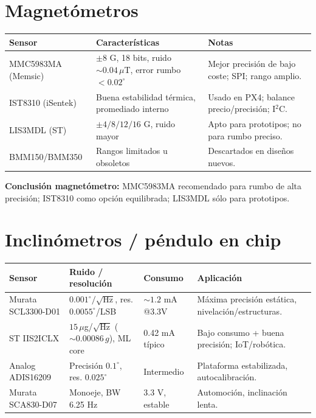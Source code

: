 \documentclass[11pt,a4paper]{article}
\begin{document}
\section{Magnetómetros}
\begin{longtable}{|>{\raggedright}p{3cm}|>{\raggedright}p{4cm}|>{\raggedright\arraybackslash}p{6cm}|}
\hline
\textbf{Sensor} & \textbf{Características} & \textbf{Notas} \\
\hline
MMC5983MA (Memsic) & $\pm 8$ G, 18 bits, ruido $\sim 0.04\,\mu$T, error rumbo $<0.02^\circ$ & Mejor precisión de bajo coste; SPI; rango amplio. \\
\hline
IST8310 (iSentek) & Buena estabilidad térmica, promediado interno & Usado en PX4; balance precio/precisión; I$^2$C. \\
\hline
LIS3MDL (ST) & $\pm 4/8/12/16$ G, ruido mayor & Apto para prototipos; no para rumbo preciso. \\
\hline
BMM150/BMM350 & Rangos limitados u obsoletos & Descartados en diseños nuevos. \\
\hline
\end{longtable}

\textbf{Conclusión magnetómetro:} MMC5983MA recomendado para rumbo de alta precisión; IST8310 como opción equilibrada; LIS3MDL sólo para prototipos.

\section{Inclinómetros / péndulo en chip}
\begin{longtable}{|>{\raggedright}p{3cm}|>{\raggedright}p{3.5cm}|>{\raggedright}p{3cm}|>{\raggedright\arraybackslash}p{3.5cm}|}
\hline
\textbf{Sensor} & \textbf{Ruido / resolución} & \textbf{Consumo} & \textbf{Aplicación} \\
\hline
Murata SCL3300-D01 & $0.001^\circ/\sqrt{\text{Hz}}$, res. $0.0055^\circ$/LSB & $\sim 1.2$ mA @3.3V & Máxima precisión estática, nivelación/estructuras. \\
\hline
ST IIS2ICLX & $15\,\mu$g/$\sqrt{\text{Hz}}$ ($\sim 0.00086\,g$), ML core & 0.42 mA típico & Bajo consumo + buena precisión; IoT/robótica. \\
\hline
Analog ADIS16209 & Precisión $0.1^\circ$, res. $0.025^\circ$ & Intermedio & Plataforma estabilizada, autocalibración. \\
\hline
Murata SCA830-D07 & Monoeje, BW 6.25 Hz & 3.3 V, estable & Automoción, inclinación lenta. \\
\hline
\end{longtable}
\end{document}
